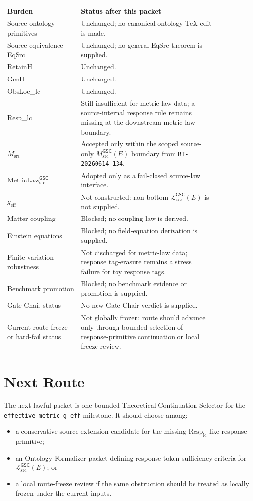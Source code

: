 \documentclass[11pt]{article}
\newcommand{\Msrc}{M_{\mathrm{src}}}
\newcommand{\MsrcGSC}{M_{\mathrm{src}}^{\mathsf{GSC}}}
\newcommand{\MetricLaw}{\mathrm{MetricLaw}_{\mathrm{src}}^{\mathsf{GSC}}}
\newcommand{\MetricData}{\mathcal{L}_{\mathrm{src}}^{\mathsf{GSC}}}
\newcommand{\geff}{g_{\mathrm{eff}}}
\newcommand{\RespLC}{\mathrm{Resp}_{\mathrm{lc}}}
\begin{document}
\begin{longtable}{p{0.30\linewidth}p{0.56\linewidth}}
\toprule
Burden & Status after this packet \\
\midrule
Source ontology primitives & Unchanged; no canonical ontology TeX edit is made. \\
Source equivalence EqSrc & Unchanged; no general EqSrc theorem is supplied. \\
RetainH & Unchanged. \\
GenH & Unchanged. \\
ObsLoc\_lc & Unchanged. \\
Resp\_lc & Still insufficient for metric-law data; a source-internal response
rule remains missing at the downstream metric-law boundary. \\
\(\Msrc\) & Accepted only within the scoped source-only
\(\MsrcGSC(E)\) boundary from \texttt{RT-20260614-134}. \\
\(\MetricLaw\) & Adopted only as a fail-closed source-law interface. \\
\(\geff\) & Not constructed; non-bottom \(\MetricData(E)\) is not supplied. \\
Matter coupling & Blocked; no coupling law is derived. \\
Einstein equations & Blocked; no field-equation derivation is supplied. \\
Finite-variation robustness & Not discharged for metric-law data; response
tag-erasure remains a stress failure for toy response tags. \\
Benchmark promotion & Blocked; no benchmark evidence or promotion is supplied. \\
Gate Chair status & No new Gate Chair verdict is supplied. \\
Current route freeze or hard-fail status & Not globally frozen; route should
advance only through bounded selection of response-primitive continuation or
local freeze review. \\
\bottomrule
\end{longtable}

\section{Next Route}

The next lawful packet is one bounded Theoretical Continuation Selector for
the \texttt{effective\_metric\_g\_eff} milestone. It should choose among:
\begin{itemize}[leftmargin=*]
  \item a conservative source-extension candidate for the missing
  \(\RespLC\)-like response primitive;
  \item an Ontology Formalizer packet defining response-token sufficiency
  criteria for \(\MetricData(E)\); or
  \item a local route-freeze review if the same obstruction should be treated
  as locally frozen under the current inputs.
\end{itemize}
\end{document}

